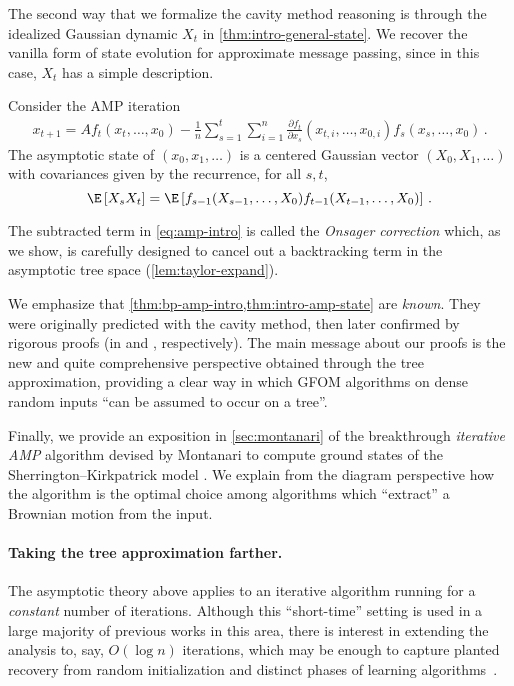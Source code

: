 \documentclass[12pt]{article}
\begin{document}
The second way that we formalize the
cavity method reasoning is through the idealized Gaussian dynamic $X_t$ in \cref{thm:intro-general-state}.
We recover the vanilla form of state evolution for approximate message passing,
since in this case, $X_t$ has a simple description.

\begin{theorem}\label{thm:intro-amp-state}
    Consider the AMP iteration
    \begin{align}
        x_{t+1} = Af_t(x_t, \ldots, x_0) - \frac 1 n \sum_{s=1}^t \sum_{i=1}^n \frac{\partial f_t}{\partial x_s}(x_{t,i},\ldots,x_{0,i}) f_s(x_s, \ldots, x_0)\,.\label{eq:amp-intro}
    \end{align}
    The asymptotic state of $(x_0, x_1, \ldots)$ is a centered Gaussian vector
    $(X_0, X_1, \ldots)$ with covariances given by the recurrence, for all $s, t$,
    \[
        \E \left[X_s X_t\right]= \E \left[f_{s-1}(X_{s-1},\ldots,X_0)f_{t-1}(X_{t-1},\ldots,X_0)\right]\,.
    \]
\end{theorem}
The subtracted term in \cref{eq:amp-intro} is called the \emph{Onsager correction}
which, as we show, is carefully
designed to cancel out a backtracking
term in the asymptotic tree space 
(\cref{lem:taylor-expand}).

We emphasize that \cref{thm:bp-amp-intro,thm:intro-amp-state}
are {\em known}. They were originally predicted with the cavity
method, then later confirmed by rigorous proofs (in \cite{bayati2015universality} and \cite{bolthausen2014iterative, bayati2011dynamics, celentano2020estimation}, respectively).
The main message about our proofs is the new and quite comprehensive perspective obtained through the tree approximation,
providing a clear way in which GFOM algorithms on dense random inputs ``can be assumed to occur on a tree''. 

Finally, we provide an exposition in \cref{sec:montanari} of the breakthrough \emph{iterative AMP} algorithm devised by Montanari to compute ground states of the Sherrington--Kirkpatrick model \cite{montanari2021optimization, AM20, AMS20:pSpinGlasses}.
We explain from the diagram perspective how the algorithm is the optimal choice among algorithms which ``extract'' a Brownian motion from the input.


\vspace{-7pt}
\paragraph{Taking the tree approximation farther.}
The asymptotic theory above applies to an iterative algorithm running for a \textit{constant} number of iterations.
Although this ``short-time'' setting is used in a large majority of previous
works in this area, there is interest in extending the analysis
to, say, $O(\log n)$ iterations, which may be enough to capture planted recovery from
random initialization and distinct phases
of learning algorithms~\cite{LFW23}.
\end{document}
